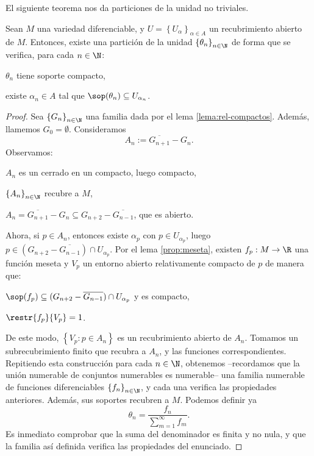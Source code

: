 El siguiente teorema nos da particiones de la unidad no triviales.
\begin{nth} \label{thm:part-recub}
  Sean $M$ una variedad diferenciable, y
  $U = \left\{ U_{\alpha} \right\}_{\alpha\in A}$ un recubrimiento abierto de
  $M$. Entonces, existe una partición de la unidad
  $\left\{ \theta_{n} \right\}_{n\in\N}$ de forma que se verifica, para cada
  $n\in\N$:
  \begin{nlist}
  \item
    $\theta_{n}$ tiene soporte compacto,
  \item
    existe $\alpha_{n}\in A$ tal que $\sop(\theta_{n})\subseteq U_{\alpha_{n}}$.
  \end{nlist}
\end{nth}
\begin{proof}
  Sea $\left\{ G_{n} \right\}_{n\in\N}$ una familia dada por el lema
  \ref{lema:rel-compactos}. Además, llamemos $G_{0} = \emptyset$. Consideramos
  \[
    A_{n} := \overline{G_{n+1}}-G_{n}
    .\]
  Observamos:
  \begin{nlist}
  \item
    $A_{n}$ es un cerrado en un compacto, luego compacto,
  \item
    $\left\{ A_{n} \right\}_{n\in\N}$ recubre a $M$,
  \item
    $A_{n} = \overline{G_{n+1}}-G_{n} \subseteq G_{n+2}-\overline{G_{n-1}}$, que
    es abierto.
  \end{nlist}
  Ahora, si $p\in A_{n}$, entonces existe $\alpha_{p}$ con $p\in
  U_{\alpha_{p}}$, luego $p\in (G_{n+2}-\overline{G_{n-1}})\cap U_{\alpha_{p}}$.
  Por el lema \ref{prop:meseta}, existen $f_{p}: M\to \R$ una función meseta y
  $V_{p}$ un entorno abierto relativamente compacto de $p$ de manera que:
  \begin{nlist}
  \item
    $\sop(f_{p}) \subseteq (G_{n+2}-\overline{G_{n-1}})\cap U_{\alpha_{p}}$ y es
    compacto,
  \item
    $\restr{f_{p}}{V_{p}} = 1$.
  \end{nlist}

  De este modo, $\left\{ V_{p} : p\in A_{n} \right\}$ es un recubrimiento
  abierto de $A_{n}$. Tomamos un subrecubrimiento finito que recubra a $A_{n}$,
  y las funciones correspondientes. Repitiendo esta construcción para cada
  $n\in\N$, obtenemos --recordamos que la unión numerable de conjuntos
  numerables es numerable-- una familia numerable de funciones diferenciables
  $\left\{ f_{n} \right\}_{n\in\N}$, y cada una verifica las propiedades
  anteriores. Además, sus soportes recubren a $M$. Podemos definir ya
  \[
    \theta_{n} = \frac{f_{n}}{\sum_{m=1}^{\infty} f_{m}}
    .\]
  Es inmediato comprobar que la suma del denominador es finita y no nula, y que
  la familia así definida verifica las propiedades del enunciado.
\end{proof}

